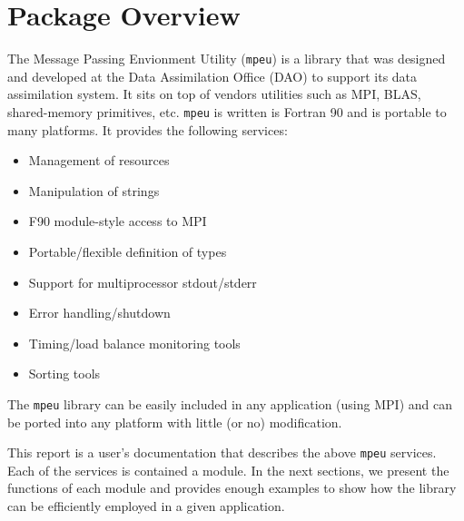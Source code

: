 \section{Package Overview }
%
% 
\setcounter{secnumdepth}{5}
\setlength{\parskip}{0.5em}
%
The Message Passing Envionment Utility ({\tt mpeu}) is a library that
was designed and developed at the Data Assimilation Office (DAO) to
support its data assimilation system.
It sits on top of vendors utilities such as MPI, BLAS, shared-memory
primitives, etc. 
%
{\tt mpeu} is written is Fortran 90 and is portable to many platforms.
It provides the following services:
%
\begin{itemize}
\item Management of resources
\item Manipulation of strings
\item F90 module-style access to MPI
\item Portable/flexible definition of types
\item Support for multiprocessor stdout/stderr
\item Error handling/shutdown
\item Timing/load balance monitoring tools
\item Sorting tools
\end{itemize}
%

The {\tt mpeu} library can be easily included in any application (using
MPI) and can be ported into any platform with little (or no) modification.

This report is a user's documentation that describes the above {\tt mpeu}
services.
Each of the services is contained a module. 
In the next sections, we present the functions of each module and provides 
enough examples to show how the library can be efficiently employed in a 
given application.
